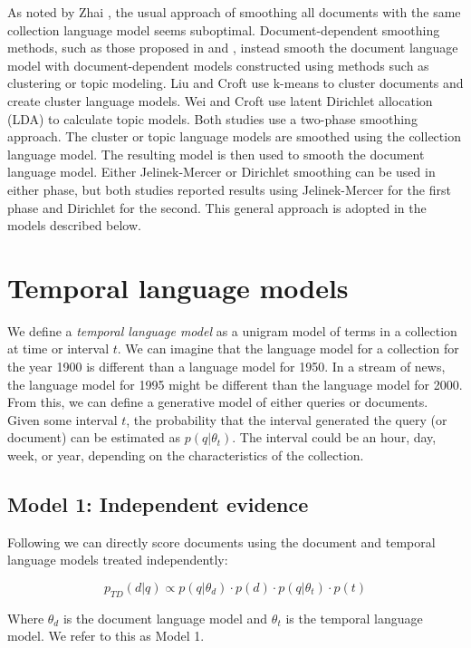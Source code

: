 \documentclass{sig-alternate}
\begin{document}
As noted by Zhai \cite{Zhai2008}, the usual approach of smoothing all documents with the same collection language model seems suboptimal. Document-dependent smoothing methods, such as those proposed in \cite{Liu2004} and  \cite{Wei2006}, instead smooth the document language model with document-dependent models constructed using methods such as clustering or topic modeling. Liu and Croft \cite{Liu2004} use k-means to cluster documents and create cluster language models.  Wei and Croft \cite{Wei2006} use latent Dirichlet allocation (LDA) to calculate topic models. Both studies use a two-phase smoothing approach. The cluster or topic language models are smoothed using the collection language model.  The resulting model is then used to smooth the document language model.  Either Jelinek-Mercer or Dirichlet smoothing can be used in either phase, but both studies reported results using Jelinek-Mercer for the first phase and Dirichlet for the second. This general approach is adopted in the models described below.

\section{Temporal language models}

We define a \textit{temporal language model} as a unigram model of terms in a collection at time or interval $t$.  We can imagine that the language model for a collection for the year 1900 is different than a language model for 1950.  In a stream of news, the language model for 1995 might be different than the language model for 2000. From this, we can define a generative model of either queries or documents. Given some interval $t$, the probability that the interval generated the query (or document) can be estimated as $p(q \vert \theta_t)$. The interval could be an hour, day, week, or year, depending on the characteristics of the collection.

\subsection{Model 1: Independent evidence}

Following \cite{Dakka2012} we can directly score documents using the document and temporal language models treated independently: 

\[ 
p_{TD}(d \vert q) \propto p(q \vert \theta_d) \cdot p(d) \cdot p(q \vert \theta_t) \cdot p(t)
\]

Where $\theta_d$ is the document language model and $\theta_t$ is the temporal language model. We refer to this as Model 1.
\end{document}

